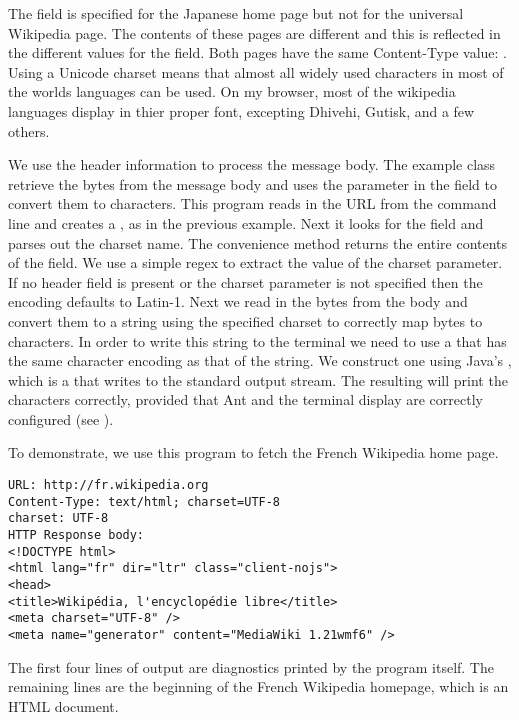 %
The field  is specified for the Japanese home page
but not for the universal Wikipedia page.  The contents of these pages are different
and this is reflected in the different values for the  field.
Both pages have the same Content-Type value: .
Using a Unicode charset means that almost all widely used characters in most of the
worlds languages can be used.
On my browser, most of the wikipedia languages display in thier proper font, excepting
Dhivehi, Gutisk, and a few others.

We use the header information to process the message body.
The example class  retrieve the bytes from the message body and
uses the  parameter in the  field to convert them
to characters.  
%
%
This program reads in the URL from the command line and creates a ,
as in the previous example.  Next it looks for the  field and
parses out the charset name.
%
%
The convenience method  returns the entire contents
of the  field.
We use a simple regex to extract the value of the charset parameter.
If no header field is present or the charset parameter is not specified
then the encoding defaults to Latin-1.
%
%
Next we read in the bytes from the body and convert them to a string
using the specified charset to correctly map bytes to characters.
%
%
In order to write this string to the terminal we need to use a 
that has the same character encoding as that of the string.
We construct one using Java's , which is a 
that writes to the standard output stream.
The resulting  will print the characters correctly,
provided that Ant and the terminal display are correctly configured (see ).

To demonstrate, we use this program to fetch the French Wikipedia home page.
\begin{verbatim}  
URL: http://fr.wikipedia.org
Content-Type: text/html; charset=UTF-8
charset: UTF-8
HTTP Response body:
<!DOCTYPE html>
<html lang="fr" dir="ltr" class="client-nojs">
<head>
<title>Wikipédia, l'encyclopédie libre</title>
<meta charset="UTF-8" />
<meta name="generator" content="MediaWiki 1.21wmf6" />
\end{verbatim}
The first four lines of output are diagnostics printed by the  program itself.
The remaining lines are the beginning of the French Wikipedia homepage,
which is an HTML document.


